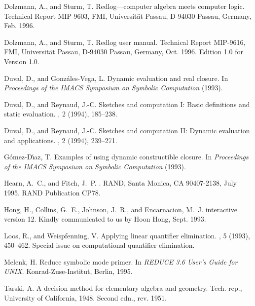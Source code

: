 \begin{thebibliography}{999}
{Dolzmann, A., and Sturm, T.}
\newblock Redlog---computer algebra meets computer logic.
\newblock Technical Report MIP-9603, FMI, Universit\"at Passau, D-94030 Passau,
  Germany, Feb. 1996.

{Dolzmann, A., and Sturm, T.}
\newblock Redlog user manual.
\newblock Technical Report MIP-9616, FMI, Universit\"at Passau, D-94030 Passau,
  Germany, Oct. 1996.
\newblock Edition 1.0 for Version 1.0.

{Duval, D., and Gonz\'ales-Vega, L.}
\newblock Dynamic evaluation and real closure.
\newblock In {\em Proceedings of the IMACS Symposium on Symbolic Computation\/}
  (1993).

{Duval, D., and Reynaud, J.-C.}
\newblock Sketches and computation {I}: Basic definitions and static
  evaluation.
, 2 (1994),
  185--238.

{Duval, D., and Reynaud, J.-C.}
\newblock Sketches and computation {II}: Dynamic evaluation and applications.
, 2 (1994),
  239--271.

{G\'omez-D\'{\i}az, T.}
\newblock Examples of using dynamic constructible closure.
\newblock In {\em Proceedings of the IMACS Symposium on Symbolic Computation\/}
  (1993).

{Hearn, A.~C., and Fitch, J.~P.}
.
\newblock RAND, Santa Monica, CA 90407-2138, July 1995.
\newblock RAND Publication CP78.

{Hong, H., Collins, G.~E., Johnson, J.~R., and Encarnacion, M.~J.}
 interactive version 12.
\newblock Kindly communicated to us by Hoon Hong, Sept. 1993.

{Loos, R., and Weispfenning, V.}
\newblock Applying linear quantifier elimination.
, 5 (1993), 450--462.
\newblock Special issue on computational quantifier elimination.

{Melenk, H.}
\newblock Reduce symbolic mode primer.
\newblock In {\em REDUCE 3.6 User's Guide for UNIX}. Konrad-Zuse-Institut,
  Berlin, 1995.

{Tarski, A.}
\newblock A decision method for elementary algebra and geometry.
\newblock Tech. rep., University of California, 1948.
\newblock Second edn., rev. 1951.


\end{thebibliography}
